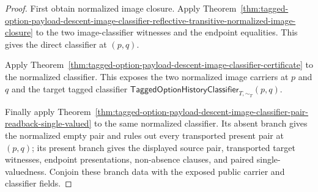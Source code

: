 \begin{proof}
First obtain normalized image closure. Apply
Theorem~\ref{thm:tagged-option-payload-descent-image-classifier-reflective-transitive-normalized-image-closure}
to the two image-classifier witnesses and the endpoint equalities. This gives
the direct classifier at $(p,q)$.

Apply
Theorem~\ref{thm:tagged-option-payload-descent-image-classifier-certificate}
to the normalized classifier. This exposes the two normalized image carriers at
$p$ and $q$ and the target tagged classifier
$\mathsf{TaggedOptionHistoryClassifier}_{T,\sim_T}(p,q)$.

Finally apply
Theorem~\ref{thm:tagged-option-payload-descent-image-classifier-pair-readback-single-valued}
to the same normalized classifier. Its absent branch gives the normalized empty
pair and rules out every transported present pair at $(p,q)$; its present branch
gives the displayed source pair, transported target witnesses, endpoint
presentations, non-absence clauses, and paired single-valuedness. Conjoin these
branch data with the exposed public carrier and classifier fields.
\end{proof}

